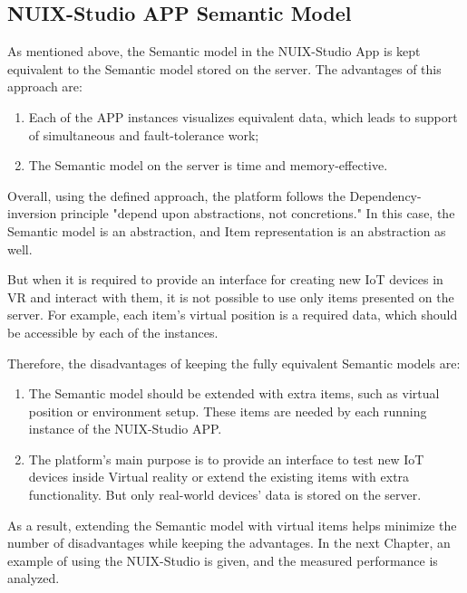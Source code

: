 \subsection{NUIX-Studio APP Semantic Model}

As mentioned above, the Semantic model in the NUIX-Studio App is kept equivalent to the Semantic model stored on the server. The advantages of this approach are:

\begin{enumerate}
    \item Each of the APP instances visualizes equivalent data, which leads to support of simultaneous and fault-tolerance work;
    \item The Semantic model on the server is time and memory-effective.
\end{enumerate}

Overall, using the defined approach, the platform follows the Dependency-inversion principle "depend upon abstractions, not concretions." In this case, the Semantic model is an abstraction, and Item representation is an abstraction as well.

But when it is required to provide an interface for creating new IoT devices in VR and interact with them, it is not possible to use only items presented on the server. For example, each item's virtual position is a required data, which should be accessible by each of the instances.

Therefore, the disadvantages of keeping the fully equivalent Semantic models are:

\begin{enumerate}
    \item The Semantic model should be extended with extra items, such as virtual position or environment setup. These items are needed by each running instance of the NUIX-Studio APP.
    \item The platform's main purpose is to provide an interface to test new IoT devices inside Virtual reality or extend the existing items with extra functionality. But only real-world devices' data is stored on the server.
\end{enumerate}

As a result, extending the Semantic model with virtual items helps minimize the number of disadvantages while keeping the advantages.
In the next Chapter, an example of using the NUIX-Studio is given, and the measured performance is analyzed.